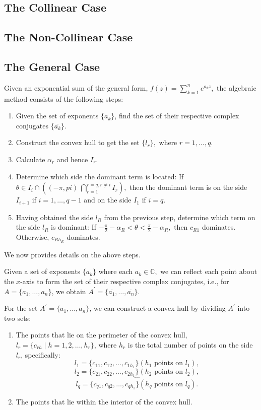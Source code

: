 \documentclass[11pt,reqno,oneside,a4paper]{article}
\begin{document}
\subsection{The Collinear Case}\label{subsec:algcol}
\subsection{The Non-Collinear Case}\label{subsec:algnoncol}
\subsection{The General Case}\label{subsec:alggen}

Given an exponential sum of the general form, $f(z) = \sum_{k=1}^{n}e^{a_k z},$ the algebraic method consists of the following steps:

\begin{enumerate}
	\item Given the set of exponents $\{a_k\}$, find the set of their respective complex conjugates $\{\overline{a_k}\}$.
	\item Construct the convex hull to get the set $\{l_r\},$ where $r = 1,\dots,q.$
	\item Calculate $\alpha_r$ and hence $I_r$.
	\item Determine which side the dominant term is located:
	If $\theta \in I_i \cap \left((-\pi,pi)\ \bigcap_{r=1}^{r=q,r\neq i}I_r \right),$ then the dominant term is on the side $I_{i+1}$ if $i = 1,\dots,q-1$ and on the side $I_1$ if $i = q$.
	\item Having obtained the side $l_R$ from the previous step, determine which term on the side $l_R$ is dominant:
	If $-\frac{\pi}{2} - \alpha_R < \theta < \frac{\pi}{2} - \alpha_R,$  then $c_{R1}$ dominates. Otherwise, $c_{R h_R}$ dominates.
\end{enumerate}

We now provides details on the above steps. 

Given a set of exponents $\{a_k\}$ where each $a_k \in \mathbb{C},$ we can reflect each point about the $x$-axis to form the set of their respective complex conjugates, i.e., for $A =\{a_1,\dots,a_n\}$, we obtain $A^\prime = \{\overline{a_1}, \dots, \overline{a_n}\}$. 

For the set $A^\prime = \{\overline{a_1}, \dots, \overline{a_n}\}$, we can construct a convex hull by dividing $A^\prime$ into two sets:

\begin{enumerate}
	\item The points that lie on the perimeter of the convex hull, $l_r = \{c_{rh}\mid h = 1,2,\dots, h_r\}$, where $h_r$ is the total number of points on the side $l_r$, specifically:
	$$l_1 = \{c_{1 1}, c_{1 2}, \dots, c_{1 h_1} \} (h_1 \text{ points on } l_1),$$
	$$l_2 = \{c_{2 1}, c_{2 2}, \dots, c_{2 h_1} \} (h_2 \text{ points on } l_2),$$
	$$\cdots$$
	$$l_q = \{c_{q 1}, c_{q 2}, \dots, c_{q h_1} \} (h_q \text{ points on } l_q).$$
	\item The points that lie within the interior of the convex hull. 
\end{enumerate}
\end{document}
